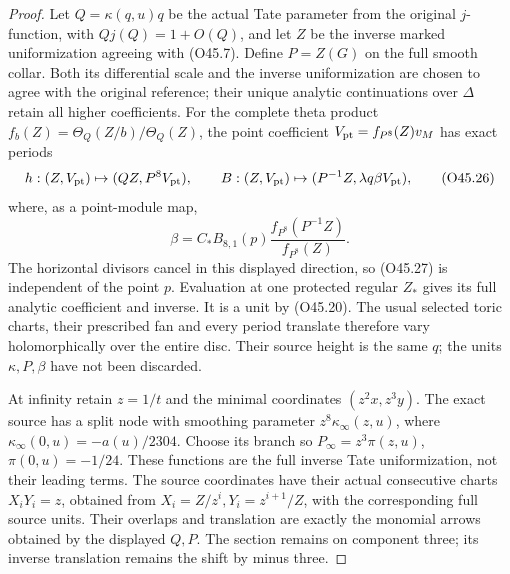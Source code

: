 \begin{proof}
Let \(Q=\kappa(q,u)q\) be the actual Tate parameter from
the original \(j\)-function, with \(Qj(Q)=1+O(Q)\), and
let \(Z\) be the inverse marked uniformization agreeing
with (O45.7). Define \(P=Z(G)\) on the full smooth collar.
Both its differential scale and the inverse uniformization
are chosen to agree with the original reference; their
unique analytic continuations over \(\Delta\) retain all
higher coefficients. For the complete theta product
\(f_b(Z)=\Theta_Q(Z/b)/\Theta_Q(Z)\), the point coefficient
\(V_{\rm pt}=f_{P^8}(Z)v_M\) has exact periods
\[
 h:(Z,V_{\rm pt})\mapsto(QZ,P^8V_{\rm pt}),\qquad
 B:(Z,V_{\rm pt})\mapsto(P^{-1}Z,\lambda q\beta V_{\rm pt}),
 \tag{O45.26}
\]
where, as a point-module map,
\[
 \beta=C_* B_{8,1}(p)
 \frac{f_{P^8}(P^{-1}Z)}{f_{P^8}(Z)}.
 \tag{O45.27}
\]
The horizontal divisors cancel in this displayed direction,
so (O45.27) is independent of the point \(p\). Evaluation
at one protected regular \(Z_*\) gives its full analytic
coefficient and inverse. It is a unit by (O45.20). The
usual selected toric charts, their prescribed fan and every
period translate therefore vary holomorphically over the
entire disc. Their source height is the same \(q\); the
units \(\kappa,P,\beta\) have not been discarded.

At infinity retain \(z=1/t\) and the minimal coordinates
\((z^2x,z^3y)\). The exact source has a split node with
smoothing parameter \(z^8\kappa_\infty(z,u)\), where
\(\kappa_\infty(0,u)=-a(u)/2304\). Choose its branch
so \(P_\infty=z^3\pi(z,u)\), \(\pi(0,u)=-1/24\).
These functions are the full inverse Tate uniformization,
not their leading terms. The source coordinates have their
actual consecutive charts \(X_iY_i=z\), obtained from
\(X_i=Z/z^i,Y_i=z^{i+1}/Z\), with the corresponding full
source units. Their overlaps and translation are exactly
the monomial arrows obtained by the displayed \(Q,P\).
The section remains on component three; its inverse
translation remains the shift by minus three.


\end{proof}
